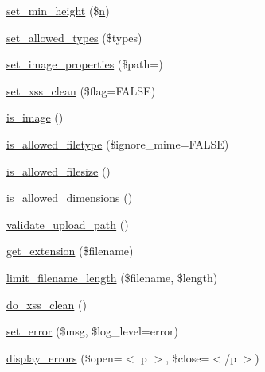 \begin{DoxyCompactItemize}
\item 
\mbox{\hyperlink{class_c_i___upload_a72c6007605b27c92dfd83c6e21fe82e3}{set\+\_\+min\+\_\+height}} (\$\mbox{\hyperlink{cli_2error__php_8php_a2e6b16bbc42094e4c51ade3c10afdcf1}{n}})
\item 
\mbox{\hyperlink{class_c_i___upload_a7c7ddfefedddc3fd625dd816d67c21bf}{set\+\_\+allowed\+\_\+types}} (\$types)
\item 
\mbox{\hyperlink{class_c_i___upload_a80c9b8c6e9f28d1f2a5a7e572c38915f}{set\+\_\+image\+\_\+properties}} (\$path=\textquotesingle{}\textquotesingle{})
\item 
\mbox{\hyperlink{class_c_i___upload_a5556024223414507d84d221862919212}{set\+\_\+xss\+\_\+clean}} (\$flag=F\+A\+L\+SE)
\item 
\mbox{\hyperlink{class_c_i___upload_af6f513bc693e3ba836f23fe9bebc6427}{is\+\_\+image}} ()
\item 
\mbox{\hyperlink{class_c_i___upload_a248e8cef69fc954953dc988e8d82afca}{is\+\_\+allowed\+\_\+filetype}} (\$ignore\+\_\+mime=F\+A\+L\+SE)
\item 
\mbox{\hyperlink{class_c_i___upload_aa1283241c3b2fc700c7b577beecd5f97}{is\+\_\+allowed\+\_\+filesize}} ()
\item 
\mbox{\hyperlink{class_c_i___upload_a70d66ccc85ab4ec9e76e02cfeaccc193}{is\+\_\+allowed\+\_\+dimensions}} ()
\item 
\mbox{\hyperlink{class_c_i___upload_a067f092935018f0d1fbfa955ddecfee3}{validate\+\_\+upload\+\_\+path}} ()
\item 
\mbox{\hyperlink{class_c_i___upload_a6c656eedccb1131accc8e350bc50632f}{get\+\_\+extension}} (\$filename)
\item 
\mbox{\hyperlink{class_c_i___upload_ab1f627192a69c4b88a44ad60ba05d0af}{limit\+\_\+filename\+\_\+length}} (\$filename, \$length)
\item 
\mbox{\hyperlink{class_c_i___upload_ae7e5f9b6d774795da126647f10c3c2a6}{do\+\_\+xss\+\_\+clean}} ()
\item 
\mbox{\hyperlink{class_c_i___upload_aab6e33df2ad916fc21e93a84b6fd48bf}{set\+\_\+error}} (\$msg, \$log\+\_\+level=\textquotesingle{}error\textquotesingle{})
\item 
\mbox{\hyperlink{class_c_i___upload_a71a6f2e6d97ff5347257f101002bc903}{display\+\_\+errors}} (\$open=\textquotesingle{}$<$ p $>$\textquotesingle{}, \$close=\textquotesingle{}$<$/p $>$\textquotesingle{})
\end{DoxyCompactItemize}
